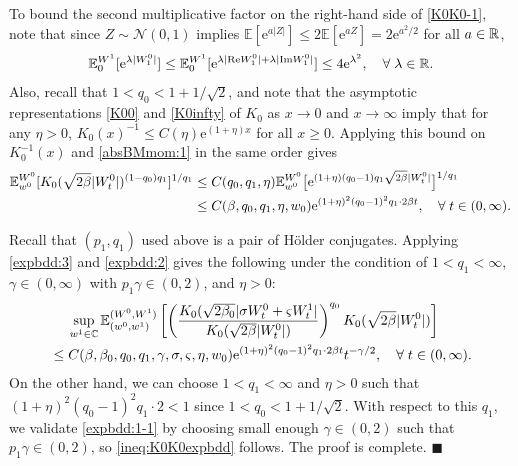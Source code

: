\documentclass[12pt, twoside]{article}
\numberwithin{figure}{section}
\renewcommand{\Re}{{\rm Re}}
\renewcommand{\Im}{{\rm Im}}
\newcommand{\e}{{\mathrm e}}
\newcommand{\1}{\mathds 1}
\newcommand{\E}{{\mathbb E}}
\newcommand{\R}{{\Bbb R}}
\newcommand{\2}{{\mathbf 1}}
\renewenvironment{proof}[1][\proofname]{\noindent {\bfseries #1.}\;}{\hfill\ensuremath{\blacksquare}\\}
\newcommand{\two}{{\sqrt{2}}}
\begin{document}
\begin{proof}
To bound the second multiplicative factor on the right-hand side of \eqref{K0K0-1}, note that since $Z\sim \mathcal N(0,1)$ implies
$\E[\e^{a|Z|}]\leq 2\E[\e^{aZ}]=2\e^{a^2/2}$ for all $a\in \R$,
\begin{align}\label{absBMmom:1}
\E^{W^1}_0[\e^{\lambda|W^0_1|}]\leq \E^{W^1}_0[\e^{\lambda|\Re W^0_1|+\lambda |\Im W^0_1|}]\leq 4\e^{\lambda^2},\quad \forall\;\lambda\in \R.
\end{align}
Also, recall that $1<q_0<1+1/\two$, and note that
the asymptotic representations \eqref{K00} and \eqref{K0infty} of $K_0$ as $x\to 0$ and $x\to\infty$ imply that for any $\eta>0$, $K_0(x)^{-1}\leq C(\eta) \e^{(1+\eta)x}$ for all $x\geq 0$. Applying this bound on $K_0^{-1}(x)$ and \eqref{absBMmom:1} in the same order gives
\begin{align}
\E^{W^0}_{w^0}[K_0(\sqrt{2\beta}|W^0_t|)^{(1-q_0)q_1}]^{1/q_1}
&\leq C(q_0,q_1,\eta)
\E^{W^0}_{w^0}\bigl[\e^{(1+\eta)(q_0-1)q_1\sqrt{2\beta}|W^0_t|}\bigr]^{1/q_1}\notag\\
&\leq C(\beta,q_0,q_1,\eta,w_0)
\e^{(1+\eta)^2(q_0-1)^2q_1\cdot 2\beta  t} ,\quad\forall\;t\in (0,\infty).\label{expbdd:2}
\end{align}

Recall that $(p_1,q_1)$ used above is a pair of H\"older conjugates. 
Applying \eqref{expbdd:3}  and \eqref{expbdd:2} gives the following under the condition of $1<q_1<\infty$, $\gamma\in (0,\infty)$ with $p_1\gamma\in (0,2)$, and $\eta>0$:
\begin{align}
\begin{split}
&\quad\;\sup_{w^1\in \Bbb C} \E^{(W^0,W^1)}_{(w^0,w^1)}\left[\left(\frac{K_0(\sqrt{2\beta_0}|\sigma W^0_t+\varsigma W_t^1|}{K_0(\sqrt{2\beta}|W_t^0|)}\right)^{q_0}K_0(\sqrt{2\beta}
|W^0_t|)
\right]\\
&\leq C(\beta,\beta_0,q_0,q_1,\gamma,\sigma,\varsigma,\eta,w_0)\e^{(1+\eta)^2(q_0-1)^2q_1\cdot 2\beta  t}t^{-\gamma/2},\quad \forall\;t\in (0,\infty).
\label{expbdd:1-1}
\end{split}
\end{align}
On the other hand, we can choose $1<q_1<\infty$ and $\eta>0$ such that $(1+\eta)^2(q_0-1)^2q_1\cdot 2<1$ since $1<q_0<1+1/\two$.
With respect to this $q_1$, we validate \eqref{expbdd:1-1} by choosing 
small enough $\gamma\in (0,2)$ such that $p_1\gamma\in (0,2)$, so \eqref{ineq:K0K0expbdd} follows. The proof is complete.
\end{proof}
\end{document}
